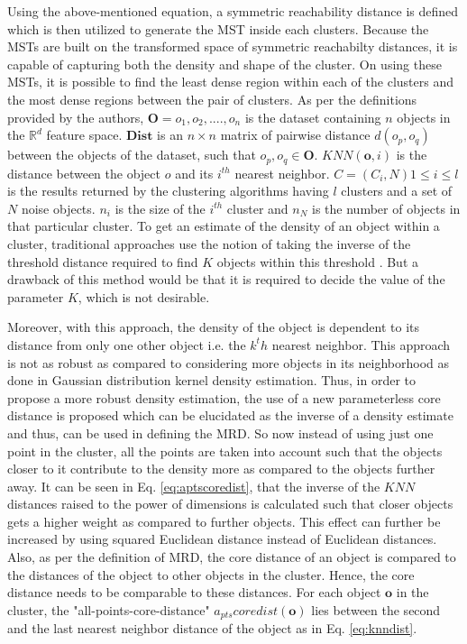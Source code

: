 Using the above-mentioned equation, a symmetric reachability distance is defined which is then utilized to generate the \ac{MST} inside each clusters. Because the \ac{MST}s are built on the transformed space of symmetric reachabilty distances, it is capable of capturing both the density and shape of the cluster. On using these \ac{MST}s, it is possible to find the least dense region within each of the clusters and the most dense regions between the pair of clusters. As per the definitions provided by the authors, $\textbf{O} = {o_1, o_2, ...., o_n}$ is the dataset containing $n$ objects in the $\mathbb{R}^d$ feature space. $\textbf{Dist}$ is an $n \times n$ matrix of pairwise distance $d(o_p,o_q)$ between the objects of the dataset, such that $o_p,o_q \in \textbf{O}$. $KNN(\textbf{o},i)$ is the distance between the object $o$ and its $i^{th}$ nearest neighbor. $C=({C_i},N) 1 \leq i \leq l$ is the results returned by the clustering algorithms having $l$ clusters and a set of $N$ noise objects. $n_i$ is the size of the $i^{th}$ cluster and $n_N$ is the number of objects in that particular cluster. To get an estimate of the density of an object within a cluster, traditional approaches use the notion of taking the inverse of the threshold distance required to find $K$ objects within this threshold \cite{hartigan1975clustering, campello2012simpler}. But a drawback of this method would be that it is required to decide the value of the parameter $K$, which is not desirable. 

\vspace{5mm}

Moreover, with this approach, the density of the object is dependent to its distance from only one other object i.e. the $k^th$ nearest neighbor. This approach is not as robust as compared to considering more objects in its neighborhood as done in Gaussian distribution kernel density estimation. Thus, in order to propose a more robust density estimation, the use of a new parameterless core distance is proposed which can be elucidated as the inverse of a density estimate and thus, can be used in defining the \ac{MRD}. So now instead of using just one point in the cluster, all the points are taken into account such that the objects closer to it contribute to the density more as compared to the objects further away. It can be seen in Eq. \ref{eq:aptscoredist}, that the inverse of the $KNN$ distances raised to the power of dimensions is calculated such that closer objects gets a higher weight as compared to further objects. This effect can further be increased by using squared Euclidean distance instead of Euclidean distances. Also, as per the definition of \ac{MRD}\cite{lelis2009semi}, the core distance of an object is compared to the distances of the object to other objects in the cluster. Hence, the core distance needs to be comparable to these distances. For each object $\textbf{o}$ in the cluster, the "all-points-core-distance" $a_{pts}coredist(\textbf{o})$ lies between the second and the last nearest neighbor distance of the object\cite{moulavi2014density} as in Eq. \ref{eq:knndist}. 

